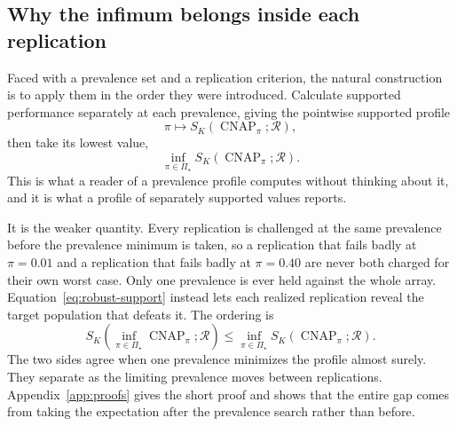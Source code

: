 \documentclass[11pt]{article}
\newcommand{\CNAP}{\operatorname{CNAP}}
\newcommand{\Regime}{\mathcal{R}}
\newcommand{\PSet}{\Pi_\star}
\theoremstyle{remark}
\begin{document}
\subsection{Why the infimum belongs inside each replication}
\label{sec:infimum-inside}

Faced with a prevalence set and a replication criterion, the natural construction is to apply them in the order they were introduced. Calculate supported performance separately at each prevalence, giving the pointwise supported profile
\[
\pi
\longmapsto
S_K(\CNAP_\pi;\Regime),
\]
then take its lowest value,
\[
\inf_{\pi\in\PSet}S_K(\CNAP_\pi;\Regime).
\]
This is what a reader of a prevalence profile computes without thinking about it, and it is what a profile of separately supported values reports.

It is the weaker quantity. Every replication is challenged at the same prevalence before the prevalence minimum is taken, so a replication that fails badly at $\pi=0.01$ and a replication that fails badly at $\pi=0.40$ are never both charged for their own worst case. Only one prevalence is ever held against the whole array. Equation~\eqref{eq:robust-support} instead lets each realized replication reveal the target population that defeats it. The ordering is
\begin{equation}
S_K\left(
\inf_{\pi\in\PSet}\CNAP_\pi;
\Regime
\right)
\leq
\inf_{\pi\in\PSet}
S_K(\CNAP_\pi;\Regime).
\label{eq:strong-weak-order}
\end{equation}
The two sides agree when one prevalence minimizes the profile almost surely. They separate as the limiting prevalence moves between replications. Appendix~\ref{app:proofs} gives the short proof and shows that the entire gap comes from taking the expectation after the prevalence search rather than before.
\end{document}
